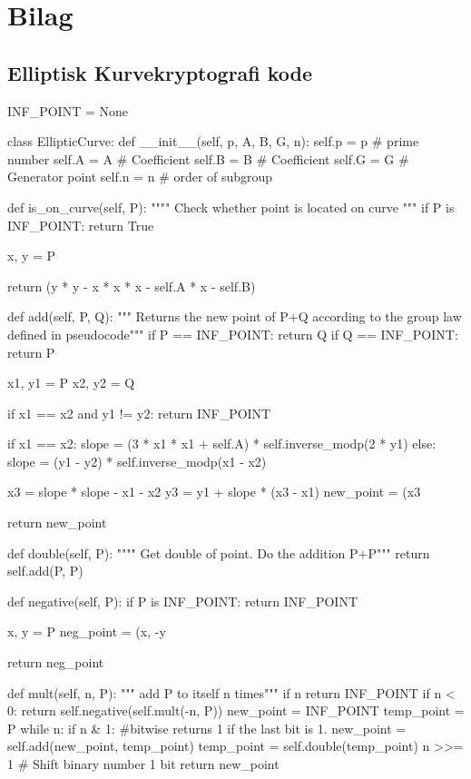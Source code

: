 \section{Bilag}

\subsection{Elliptisk Kurvekryptografi kode}
\label{sec:code}
\begin{python}
INF_POINT = None 

class EllipticCurve:
	def __init__(self, p, A, B, G, n):
		self.p = p # prime number
		self.A = A # Coefficient
		self.B = B # Coefficient
		self.G = G # Generator point
		self.n = n # order of subgroup

	def is_on_curve(self, P):
		"""" Check whether point is located on curve """
		if P is INF_POINT:
			return True

		x, y = P
		
		return (y * y - x * x * x - self.A * x - self.B) %

	def add(self, P, Q):
		""" Returns the new point of P+Q according to the group law defined in pseudocode"""
		if P == INF_POINT:
			return Q
		if Q == INF_POINT:
			return P
		
		x1, y1 = P
		x2, y2 = Q

		if x1 == x2 and y1 != y2:
			return INF_POINT

		if x1 == x2:
			slope = (3 * x1 * x1 + self.A) * self.inverse_modp(2 * y1)			
		else:
			slope = (y1 - y2) * self.inverse_modp(x1 - x2)

		x3 = slope * slope - x1 - x2
		y3 = y1 + slope * (x3 - x1)
		new_point = (x3 %

		return new_point

	def double(self, P):
		"""" Get double of point. Do the addition P+P"""
		return self.add(P, P)

	def negative(self, P):
		if P is INF_POINT:
			return INF_POINT
		
		x, y = P
		neg_point = (x, -y %

		return neg_point

	def mult(self, n, P):
		""" add P to itself n times"""	
		if n %
			return INF_POINT
		if n < 0:
			return self.negative(self.mult(-n, P))
		new_point = INF_POINT
		temp_point = P
		while n:
			if n & 1: #bitwise returns 1 if the last bit is 1.
				new_point = self.add(new_point, temp_point)
			temp_point = self.double(temp_point)
			n >>= 1 # Shift binary number 1 bit
		return new_point


\end{python}
